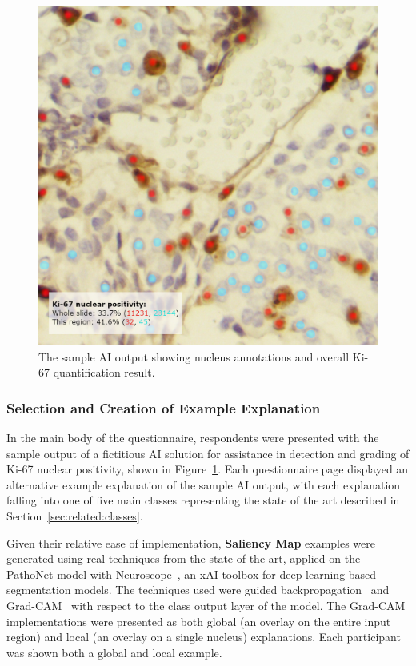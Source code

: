 \documentclass[final,5p,times,twocolumn,hyphens]{elsarticle}
\begin{document}
\begin{figure}[!ht]
    \centering
    \includegraphics[width=0.85\linewidth]{base_image.png}
    \caption{The sample AI output showing nucleus annotations and overall Ki-67 quantification result.}
    \label{fig:exampleoutput}
\end{figure}

\subsubsection{Selection and Creation of Example Explanation}

In the main body of the questionnaire, respondents were presented with the sample output of a fictitious AI solution for assistance in detection and grading of Ki-67 nuclear positivity,  shown in Figure~\ref{fig:exampleoutput}. Each questionnaire page displayed an alternative example explanation of the sample AI output, with each explanation falling into one of five main classes representing the state of the art described in Section~\ref{sec:related:classes}.

Given their relative ease of implementation, \textbf{Saliency Map} examples were generated using real techniques from the state of the art, applied on the PathoNet model with Neuroscope~\cite{schorr_neuroscope_2021}, an xAI toolbox for deep learning-based segmentation models. The techniques used were guided backpropagation~\cite{springenberg2014striving} and Grad-CAM~\cite{selvaraju2017grad} with respect to the class output layer of the model. The Grad-CAM implementations were presented as both global (an overlay on the entire input region) and local (an overlay on a single nucleus) explanations. Each participant was shown both a global and local example.
\end{document}
